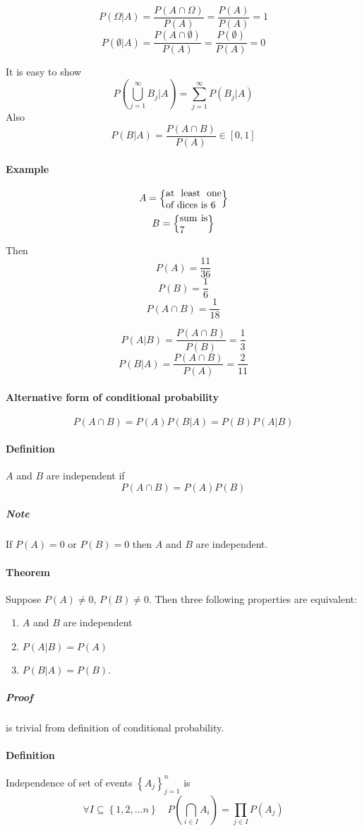 $$P(\Omega|A) = \frac{P(A \cap \Omega)}{P(A)} = \frac{P(A)}{P(A)} = 1$$
$$P(\emptyset|A) = \frac{P(A \cap \emptyset)}{P(A)} = \frac{P(\emptyset)}{P(A)} = 0$$

It is easy to show
$$P\left( \bigcup_{j=1}^\infty B_j | A \right) = \sum_{j=1}^\infty P\left( B_j | A \right) $$
Also 
$$P(B|A) = \frac{P(A\cap B)}{P(A)} \in [0,1]$$
\paragraph{Example}
$$A = \left\{ \parbox{2cm}{at least one of dices is 6 } \right\}$$
$$B = \left\{ \parbox{1cm}{sum is 7 } \right\}$$

Then
$$P(A) = \frac{11}{36}$$
$$P(B) = \frac{1}{6}$$
$$P(A\cap B) = \frac{1}{18}$$

$$P(A|B) = \frac{P(A\cap B)}{P(B)} = \frac{1}{3} $$
$$P(B|A) = \frac{P(A\cap B)}{P(A)} = \frac{2}{11} $$


\paragraph{Alternative form of conditional probability}
$$P(A\cap B) = P(A)P(B|A) = P(B)P(A|B)$$
\paragraph{Definition} $A$ and $B$ are independent if $$P(A\cap B) = P(A)P(B)$$
\subparagraph{Note} If $P(A) = 0 $ or $P(B) = 0$ then $A$ and $B$ are independent.
\paragraph{Theorem} Suppose $P(A) \neq 0$, $P(B)\neq 0$. Then three following properties are equivalent:
\begin{enumerate}
	\item $A$ and $B$ are independent
	\item $P(A|B) = P(A)$
	\item $P(B|A) = P(B)$.
\end{enumerate}
\subparagraph{Proof} is trivial from definition of conditional probability.
\paragraph{Definition} Independence of set of events $\left\{ A_j \right\}_{j=1}^n$ is
$$\forall I \subseteq \left\{ 1,2,\dots n \right\} \quad P\left( \bigcap_{i\in I} A_i \right) = \prod_{j \in I} P(A_j)$$

